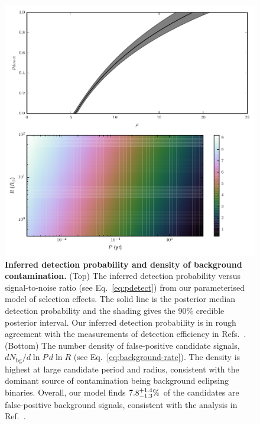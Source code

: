 \documentclass{nature}
\newcommand{\Nbg}{N_\mathrm{bg}}
\begin{document}
\begin{figure}
  \includegraphics[width=\columnwidth]{bg}
  \caption{\label{fig:det-bg} \textbf{Inferred detection probability
      and density of background contamination.} (Top) The inferred
    detection probability versus signal-to-noise ratio (see
    Eq.\ \eqref{eq:pdetect}) from our parameterised model of selection
    effects.  The solid line is the posterior median detection
    probability and the shading gives the 90\% credible posterior
    interval.  Our inferred detection probability is in rough
    agreement with the measurements of detection efficiency in
    Refs.\ \cite{Borucki2011,Batalha2013}.  (Bottom) The number
    density of false-positive candidate signals, $d\Nbg/d\ln P \, d\ln
    R$ (see Eq.\ \eqref{eq:background-rate}).  The density is highest
    at large candidate period and radius, consistent with the dominant
    source of contamination being background eclipsing
    binaries\cite{Fressin2013}.  Overall, our model finds $7.8_{-1.3}^{+1.4}\%$
    of the candidates are false-positive background signals,
    consistent with the analysis in Ref.\ \cite{Fressin2013}.}
\end{figure}
\end{document}
